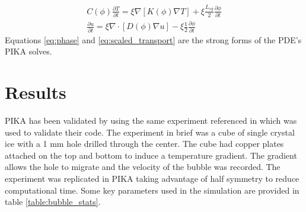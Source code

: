 \documentclass[twoside]{article}
\begin{document}
\begin{multicols}{2}
\begin{subequations} \label{eq:scaled_transport}
\begin{align}
	C(\phi)\frac{\partial T}{\partial t} = \xi\nabla [K(\phi) \nabla T] + \xi\frac{L_{sg}}{2}\frac{\partial \phi}{\partial t}\\
	\frac{\partial u}{\partial t} = \xi\nabla \cdot [D(\phi) \nabla u] - \xi \frac{ 1}{2}\frac{\partial \phi}{\partial t}
\end{align}
\end{subequations}
Equations \eqref{eq:phase} and \eqref{eq:scaled_transport} are the strong forms of the PDE's PIKA solves.


\section{Results}
PIKA has been validated by using the same experiment referenced in \cite{Plapp_2009} which was used to validate their code. The experiment in brief was a cube of single crystal ice with a 1 mm hole drilled through the center. The cube had copper plates attached on the top and bottom to induce a temperature gradient. The gradient allows the hole to migrate and the velocity of the bubble was recorded. The experiment was replicated in PIKA taking advantage of half symmetry to reduce computational time.  Some key parameters used in the simulation are provided in table \ref{table:bubble_stats}.


\end{multicols}
\end{document}
